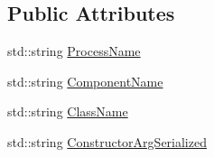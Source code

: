 \subsection*{Public Attributes}
\begin{DoxyCompactItemize}
\item 
std\-::string \hyperlink{classmts_description_component_a84c50616e9ae8b624261a21399d91395}{Process\-Name}
\item 
std\-::string \hyperlink{classmts_description_component_ad8aaca842f71e592a1bd50c483cc1bad}{Component\-Name}
\item 
std\-::string \hyperlink{classmts_description_component_a38a518bbf9ec10334313b6d558c7c774}{Class\-Name}
\item 
std\-::string \hyperlink{classmts_description_component_a16a127a39f87ca4c87c1cd34b6393f6b}{Constructor\-Arg\-Serialized}
\end{DoxyCompactItemize}


